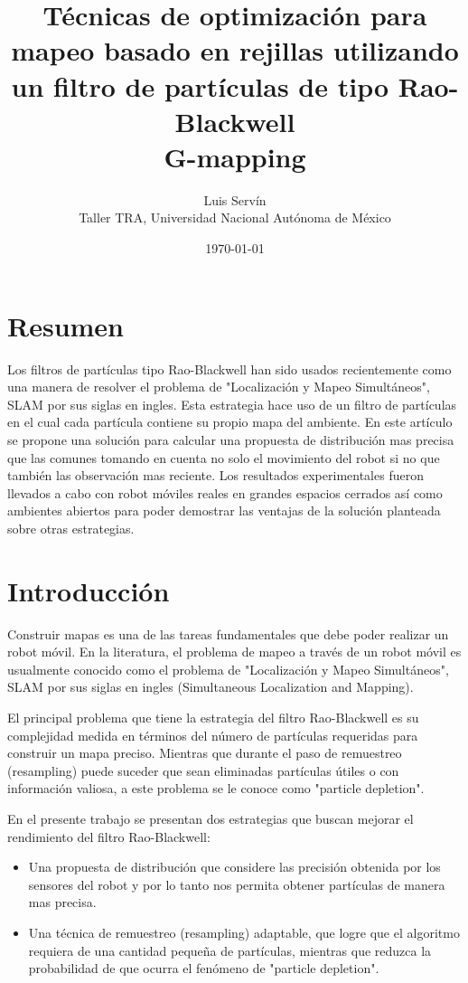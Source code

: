 \documentclass[10pt,a4paper]{article}
\title{Técnicas de optimización para mapeo basado en rejillas utilizando un filtro de partículas de tipo Rao-Blackwell \\ \large{G-mapping}}
\date{\today}
\author{Luis Servín\\ Taller TRA, Universidad Nacional Autónoma de México}
\begin{document}
\maketitle

\section{Resumen}

Los filtros de partículas tipo Rao-Blackwell han sido usados recientemente como una manera de resolver el problema de "Localización y Mapeo Simultáneos", SLAM por sus siglas en ingles. Esta estrategia hace uso de un filtro de partículas en el cual cada partícula contiene su propio mapa del ambiente. En este artículo se propone una solución para calcular una propuesta de distribución mas precisa que las comunes tomando en cuenta no solo el movimiento del robot si no que también las observación mas reciente. Los resultados experimentales fueron llevados a cabo con robot móviles reales en grandes espacios cerrados así como ambientes abiertos para poder demostrar las ventajas de la solución planteada sobre otras estrategias.

\section{Introducción}

Construir mapas es una de las tareas fundamentales que debe poder realizar un robot móvil. En la literatura, el problema de mapeo a través de un robot móvil es usualmente conocido como el problema de "Localización y Mapeo Simultáneos", SLAM por sus siglas en ingles (Simultaneous Localization and Mapping).

El principal problema que tiene la estrategia del filtro Rao-Blackwell es su complejidad medida en términos del número de partículas requeridas para construir un mapa preciso. Mientras que durante el paso de remuestreo (resampling) puede suceder que sean eliminadas partículas útiles o con información valiosa, a este problema se le conoce como "particle depletion".

En el presente trabajo se presentan dos estrategias que buscan mejorar el rendimiento del filtro Rao-Blackwell:

\begin{itemize}

\item Una propuesta de distribución que considere las precisión obtenida por los sensores del robot y por lo tanto nos permita obtener partículas de manera mas precisa.
\item Una técnica de remuestreo (resampling) adaptable, que logre que el algoritmo requiera de una cantidad pequeña de partículas, mientras que reduzca la probabilidad de que ocurra el fenómeno de "particle depletion".

\end{itemize}
\end{document}
